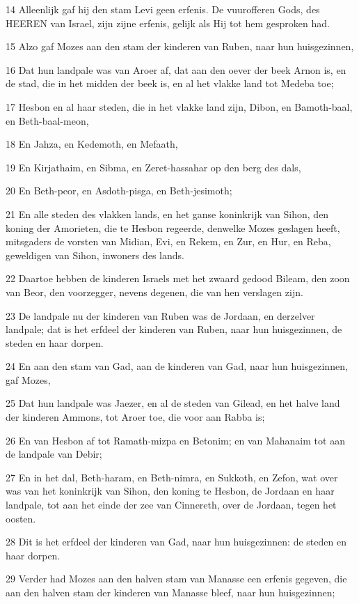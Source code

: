 \par 14 Alleenlijk gaf hij den stam Levi geen erfenis. De vuurofferen Gods, des HEEREN van Israel, zijn zijne erfenis, gelijk als Hij tot hem gesproken had.
\par 15 Alzo gaf Mozes aan den stam der kinderen van Ruben, naar hun huisgezinnen,
\par 16 Dat hun landpale was van Aroer af, dat aan den oever der beek Arnon is, en de stad, die in het midden der beek is, en al het vlakke land tot Medeba toe;
\par 17 Hesbon en al haar steden, die in het vlakke land zijn, Dibon, en Bamoth-baal, en Beth-baal-meon,
\par 18 En Jahza, en Kedemoth, en Mefaath,
\par 19 En Kirjathaim, en Sibma, en Zeret-hassahar op den berg des dals,
\par 20 En Beth-peor, en Asdoth-pisga, en Beth-jesimoth;
\par 21 En alle steden des vlakken lands, en het ganse koninkrijk van Sihon, den koning der Amorieten, die te Hesbon regeerde, denwelke Mozes geslagen heeft, mitsgaders de vorsten van Midian, Evi, en Rekem, en Zur, en Hur, en Reba, geweldigen van Sihon, inwoners des lands.
\par 22 Daartoe hebben de kinderen Israels met het zwaard gedood Bileam, den zoon van Beor, den voorzegger, nevens degenen, die van hen verslagen zijn.
\par 23 De landpale nu der kinderen van Ruben was de Jordaan, en derzelver landpale; dat is het erfdeel der kinderen van Ruben, naar hun huisgezinnen, de steden en haar dorpen.
\par 24 En aan den stam van Gad, aan de kinderen van Gad, naar hun huisgezinnen, gaf Mozes,
\par 25 Dat hun landpale was Jaezer, en al de steden van Gilead, en het halve land der kinderen Ammons, tot Aroer toe, die voor aan Rabba is;
\par 26 En van Hesbon af tot Ramath-mizpa en Betonim; en van Mahanaim tot aan de landpale van Debir;
\par 27 En in het dal, Beth-haram, en Beth-nimra, en Sukkoth, en Zefon, wat over was van het koninkrijk van Sihon, den koning te Hesbon, de Jordaan en haar landpale, tot aan het einde der zee van Cinnereth, over de Jordaan, tegen het oosten.
\par 28 Dit is het erfdeel der kinderen van Gad, naar hun huisgezinnen: de steden en haar dorpen.
\par 29 Verder had Mozes aan den halven stam van Manasse een erfenis gegeven, die aan den halven stam der kinderen van Manasse bleef, naar hun huisgezinnen;
